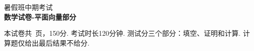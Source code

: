 \documentclass[12pt, a4paper]{article}
\def\mycenter#1{\begin{center} \bf \sffamily \large #1 \end{center}}
\begin{document}
\begin{center}
    \huge 暑假班中期考试 \\
    \Large \bf \sffamily 数学试卷-平面向量部分
\end{center}

本试卷共\pageref{LastPage}\ 页，150分. 考试时长120分钟. 测试分三个部分：填空、证明和计算. 计算题仅给出最后结果不给分. 


\end{document}
